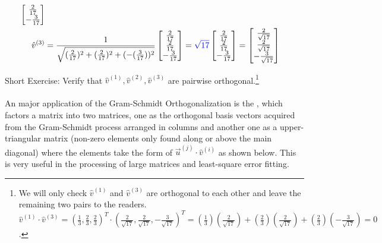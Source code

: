 \begin{solution}
\begin{align*}
\begin{bmatrix}
\frac{2}{17} \\
-\frac{3}{17}
\end{bmatrix}
\\
\hat{v}^{(3)} &= \frac{1}{\sqrt{(\frac{2}{17})^2 + (\frac{2}{17})^2 + (-(\frac{3}{17}))^2}}
\begin{bmatrix}
\frac{2}{17} \\
\frac{2}{17} \\
-\frac{3}{17}
\end{bmatrix}
=
\textcolor{blue}{\sqrt{17}}
\begin{bmatrix}
\frac{2}{17} \\
\frac{2}{17} \\
-\frac{3}{17}
\end{bmatrix}
=
\begin{bmatrix}
\frac{2}{\sqrt{17}} \\
\frac{2}{\sqrt{17}} \\
-\frac{3}{\sqrt{17}}
\end{bmatrix}
\end{align*}
\end{solution}
Short Exercise: Verify that $\hat{v}^{(1)}, \hat{v}^{(2)}, \hat{v}^{(3)}$ are pairwise orthogonal.\footnote{We will only check $\hat{v}^{(1)}$ and $\hat{v}^{(3)}$ are orthogonal to each other and leave the remaining two pairs to the readers. $\hat{v}^{(1)} \cdot \hat{v}^{(3)} = (\frac{1}{3}, \frac{2}{3}, \frac{2}{3})^T \cdot (\frac{2}{\sqrt{17}}, \frac{2}{\sqrt{17}}, -\frac{3}{\sqrt{17}})^T = (\frac{1}{3})(\frac{2}{\sqrt{17}}) + (\frac{2}{3})(\frac{2}{\sqrt{17}}) + (\frac{2}{3})(-\frac{3}{\sqrt{17}}) = 0$.} \\
\\
An major application of the Gram-Schmidt Orthogonalization is the , which factors a matrix into two matrices, one as the orthogonal basis vectors acquired from the Gram-Schmidt process arranged in columns and another one as a upper-triangular matrix (non-zero elements only found along or above the main diagonal) where the elements take the form of $\vec{u}^{(j)} \cdot \hat{v}^{(i)}$ as shown below. This is very useful in the processing of large matrices and least-square error fitting.
